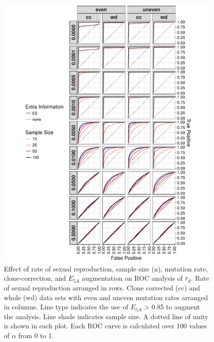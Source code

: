 \documentclass[]{article}
\theoremstyle{definition}
\theoremstyle{definition}
\theoremstyle{remark}
\begin{document}
\begin{figure}
\centering
\includegraphics[width=1.00000\textwidth]{figure/ROC_Curve.pdf}
\caption{Effect of rate of sexual reproduction, sample size (n),
mutation rate, clone-correction, and \(E_{5A}\) augmentation on ROC
analysis of \(\bar{r}_d\). Rate of sexual reproduction arranged in rows.
Clone corrected (cc) and whole (wd) data sets with even and uneven
mutation rates arranged in columns. Line type indicates the use of
\(E_{5A}\) \textgreater{} 0.85 to augment the analysis. Line shade
indicates sample size. A dotted line of unity is shown in each plot.
Each ROC curve is calculated over 100 values of \(\alpha\) from 0 to
1.}\label{fig:simroc}
\end{figure}
\end{document}
